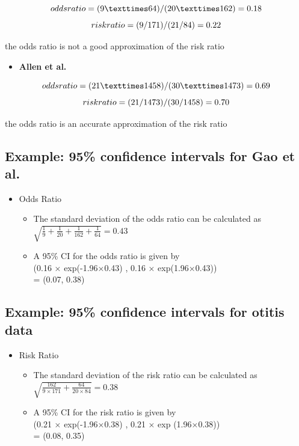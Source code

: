 \documentclass[
]{book}
\providecommand{\tightlist}{%
  \setlength{\itemsep}{0pt}\setlength{\parskip}{0pt}}
\begin{document}
\[odds\space ratio = (9×64)/(20×162)=0.18\]
\[risk\space ratio = (9/171)/(21/84)=0.22\]

the odds ratio is not a good approximation of the risk ratio

\begin{itemize}
\tightlist
\item
  \textbf{Allen et al.}
\end{itemize}

\[odds\space ratio = (21×1458)/(30×1473)=0.69\]
\[risk\space ratio =(21/1473)/(30/1458)=0.70\]

the odds ratio is an accurate approximation of the risk ratio

\hypertarget{example-95-confidence-intervals-for-gao-et-al.}{%
\subsection{Example: 95\% confidence intervals for Gao et al.}\label{example-95-confidence-intervals-for-gao-et-al.}}

\begin{itemize}
\tightlist
\item
  Odds Ratio

  \begin{itemize}
  \tightlist
  \item
    The standard deviation of the odds ratio can be calculated as \(\sqrt{\frac{1}{9}+\frac{1}{20}+\frac{1}{162}+\frac{1}{64}}=0.43\)
  \item
    A 95\% CI for the odds ratio is given by\\
    (0.16 × exp(-1.96×0.43) , 0.16 × exp(1.96×0.43))\\
    = (0.07, 0.38)
  \end{itemize}
\end{itemize}

\hypertarget{example-95-confidence-intervals-for-otitis-data}{%
\subsection{Example: 95\% confidence intervals for otitis data}\label{example-95-confidence-intervals-for-otitis-data}}

\begin{itemize}
\tightlist
\item
  Risk Ratio

  \begin{itemize}
  \tightlist
  \item
    The standard deviation of the risk ratio can be calculated as \(\sqrt{\frac{162}{9\times 171}+\frac{64}{20\times 84}}=0.38\)
  \item
    A 95\% CI for the risk ratio is given by\\
    (0.21 × exp(-1.96×0.38) , 0.21 × exp (1.96×0.38))\\
    = (0.08, 0.35)
  \end{itemize}
\end{itemize}
\end{document}
